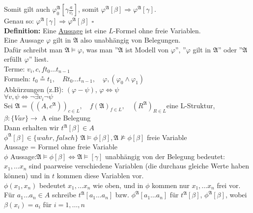 \documentclass[a4paper]{scrartcl}
\newcommand{\mfa}{\mathfrak{A}}  %
\begin{document}
Somit gilt auch $\varphi_0^\mfa[\gamma \frac{a}{v_i}]$, somit $\varphi^\mfa[\beta] \Rightarrow \varphi^\mfa[\gamma]$.\smallskip\\
Genau so: $\varphi^\mfa[\gamma] \Rightarrow \varphi^\mfa[\beta]$ \hfill $\square$\medskip\\
\textbf{Definition:}
Eine \underline{Aussage} ist eine $L$-Formel ohne freie Variablen.\medskip\\
Eine Aussage $\varphi$ gilt in $\mfa$ also unabhängig von Belegungen.\\
Dafür schreibt man $\mfa \vDash \varphi$, was man ''$\mfa$ ist Modell von $\varphi$'', ''$\varphi$ gilt in $\mfa$'' oder ''$\mfa$ erfüllt $\varphi$'' liest.\\

	\medskip 
	Terme: 
		$v_{i}, c, ft_{0} \dots t_{n-1}$ \\
	Formeln:  
		$t_0 \circeq t_1,\quad  Rt_0 \dots t_{n-1}, \quad $\textlnot$ \varphi, (\varphi_0 \wedge \varphi_1) $ \\
	Abkürzungen (z.B): 
		$(\varphi - \psi) $, $\varphi \Leftrightarrow \psi$\\
		$ \forall v, \psi \Leftrightarrow \lnot \exists v_i \lnot \psi $\\
	Sei $ \mfa = ((A, c^{\mfa}))_{c \in L},\quad f(\mfa)_{f \in L}, \quad  (R^{\mfa})_{R \in L} $eine L-Struktur, \\
	$\beta :  \lbrace Var \rbrace  \rightarrow$ A eine Belegung  \\
	\medskip 
	Dann erhalten wir 
		$t^{\mfa} \left[\beta \right] \in A $\\
		$\phi^\mfa \left[\beta \right] \in \lbrace wahr, falsch \rbrace $
		$\mfa \models \phi \left[ \beta\right], \mfa \nvDash \phi \left[ \beta \right]$ freie Variable \\
	Aussage = Formel ohne freie Variable \\
	$\phi$ Aussage:$ \mfa \models \phi \left[ \beta \right] \Leftrightarrow \mfa \models \left[ \gamma \right]$ unabhängig von der Belegung bedeutet:\\
		 $x_1, \dots x_n$ sind paarweise verschiedene Variablen (die durchaus gleiche Werte haben können) und in $t$ kommen diese Variablen vor.\\
	$\phi (x_1, x_n)$ bedeutet $x_1, \dots x_n$ wie oben, und in $\phi$ kommen nur $x_1, \dots x_n$ frei vor.\\
	Für $a_1 \dots a_n \in A$ schreibe $t^\mfa \left[ a_1 \dots a_n \right]$ bzw. $\phi^\mfa \left[ a_1 \dots a_n \right]$ für $t^\mfa \left[ \beta \right]$, $\phi^\mfa \left[\beta \right]$, wobei $\beta(x_i) = a_i$ für $i = 1, \dots, n$\\
	
\end{document}
